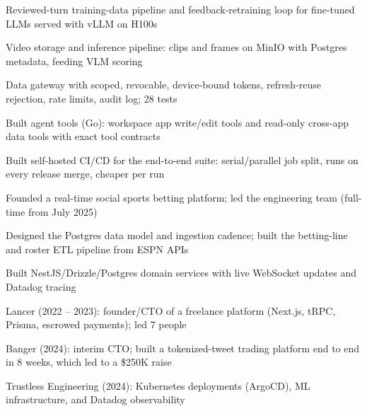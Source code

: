 \documentclass[print]{jack-resume}
\begin{document}
\begin{tightemize}
    \item Reviewed-turn training-data pipeline and feedback-retraining loop for fine-tuned LLMs served with vLLM on H100s
    \item Video storage and inference pipeline: clips and frames on MinIO with Postgres metadata, feeding VLM scoring
    \item Data gateway with scoped, revocable, device-bound tokens, refresh-reuse rejection, rate limits, audit log; 28 tests
    \item Built agent tools (Go): workspace app write/edit tools and read-only cross-app data tools with exact tool contracts
    \item Built self-hosted CI/CD for the end-to-end suite: serial/parallel job split, runs on every release merge, cheaper per run
\end{tightemize}
\sectionsep

\begin{tightemize}
    \item Founded a real-time social sports betting platform; led the engineering team (full-time from July 2025)
    \item Designed the Postgres data model and ingestion cadence; built the betting-line and roster ETL pipeline from ESPN APIs
    \item Built NestJS/Drizzle/Postgres domain services with live WebSocket updates and Datadog tracing
\end{tightemize}
\sectionsep

\begin{tightemize}
    \item Lancer (2022 -- 2023): founder/CTO of a freelance platform (Next.js, tRPC, Prisma, escrowed payments); led 7 people
    \item Banger (2024): interim CTO; built a tokenized-tweet trading platform end to end in 8 weeks, which led to a \$250K raise
    \item Trustless Engineering (2024): Kubernetes deployments (ArgoCD), ML infrastructure, and Datadog observability
\end{tightemize}
\sectionsep
\end{document}
